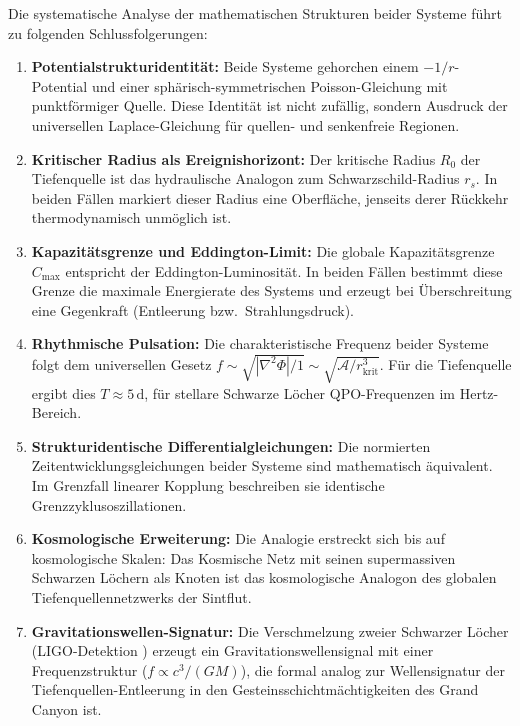 ﻿\documentclass[12pt,a4paper]{report}
\begin{document}
Die systematische Analyse der mathematischen Strukturen beider Systeme führt zu folgenden Schlussfolgerungen:

\begin{enumerate}
	\item \textbf{Potentialstrukturidentität:} Beide Systeme gehorchen einem $-1/r$-Potential und einer sphärisch-symmetrischen Poisson-Gleichung mit punktförmiger Quelle. Diese Identität ist nicht zufällig, sondern Ausdruck der universellen Laplace-Gleichung für quellen- und senkenfreie Regionen.
	
	\item \textbf{Kritischer Radius als Ereignishorizont:} Der kritische Radius $R_0$ der Tiefenquelle ist das hydraulische Analogon zum Schwarzschild-Radius $r_s$. In beiden Fällen markiert dieser Radius eine Oberfläche, jenseits derer Rückkehr thermodynamisch unmöglich ist.
	
	\item \textbf{Kapazitätsgrenze und Eddington-Limit:} Die globale Kapazitätsgrenze $C_{\max}$ entspricht der Eddington-Luminosität. In beiden Fällen bestimmt diese Grenze die maximale Energierate des Systems und erzeugt bei Überschreitung eine Gegenkraft (Entleerung bzw.\ Strahlungsdruck).
	
	\item \textbf{Rhythmische Pulsation:} Die charakteristische Frequenz beider Systeme folgt dem universellen Gesetz $f \sim \sqrt{|\nabla^2\Phi|/1} \sim \sqrt{\mathcal{A}/r_{\mathrm{krit}}^3}$. Für die Tiefenquelle ergibt dies $T \approx 5\,\mathrm{d}$, für stellare Schwarze Löcher QPO-Frequenzen im Hertz-Bereich.
	
	\item \textbf{Strukturidentische Differentialgleichungen:} Die normierten Zeitentwicklungsgleichungen beider Systeme sind mathematisch äquivalent. Im Grenzfall linearer Kopplung beschreiben sie identische Grenzzyklusoszillationen.
	
	\item \textbf{Kosmologische Erweiterung:} Die Analogie erstreckt sich bis auf kosmologische Skalen: Das Kosmische Netz mit seinen supermassiven Schwarzen Löchern als Knoten ist das kosmologische Analogon des globalen Tiefenquellennetzwerks der Sintflut.
	
	\item \textbf{Gravitationswellen-Signatur:} Die Verschmelzung zweier Schwarzer Löcher (LIGO-Detektion \cite{abbott2016ligo}) erzeugt ein Gravitationswellensignal mit einer Frequenzstruktur ($f \propto c^3/(GM)$), die formal analog zur Wellensignatur der Tiefenquellen-Entleerung in den Gesteinsschichtmächtigkeiten des Grand Canyon ist.
\end{enumerate}
\end{document}
